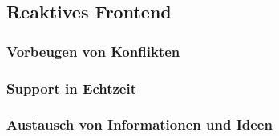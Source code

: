 \subsection{Reaktives Frontend}
\label{ssec:ea-reaktives-frontend}

\subsubsection{Vorbeugen von Konflikten}
\label{sssec:ear-vorbeugen-von-konflikten}

\subsubsection{Support in Echtzeit}
\label{sssec:ear-support-in-echtzeit}

\subsubsection{Austausch von Informationen und Ideen}
\label{sssec:ear-austausch-von-informationen-und-ideen}
